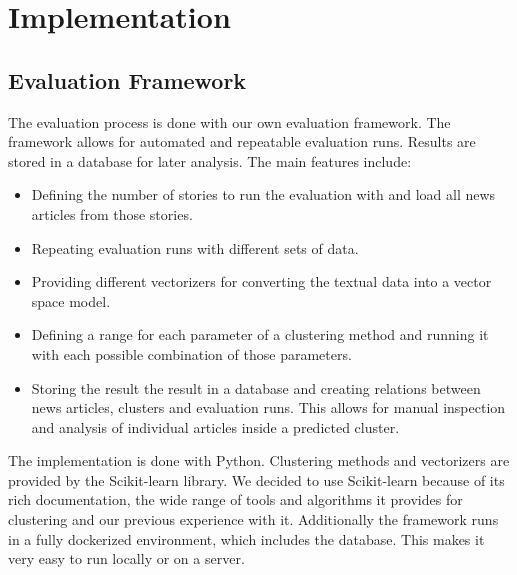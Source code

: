 \section{Implementation}

\subsection{Evaluation Framework}
The evaluation process is done with our own evaluation framework. The framework allows for automated and repeatable evaluation runs. Results are stored in a database for later analysis. The main features include:

\begin{itemize}
    \item Defining the number of stories to run the evaluation with and load all news articles from those stories. 
    \item Repeating evaluation runs with different sets of data.
    \item Providing different vectorizers for converting the textual data into a vector space model.
    \item Defining a range for each parameter of a clustering method and running it with each possible combination of those parameters. 
    \item Storing the result the result in a database and creating relations between news articles, clusters and evaluation runs. This allows for manual inspection and analysis of individual articles inside a predicted cluster. 
\end{itemize}

The implementation is done with Python. Clustering methods and vectorizers are provided by the Scikit-learn library. We decided to use Scikit-learn because of its rich documentation, the wide range of tools and algorithms it provides for clustering and our previous experience with it. Additionally the framework runs in a fully dockerized environment, which includes the database. This makes it very easy to run locally or on a server. 

